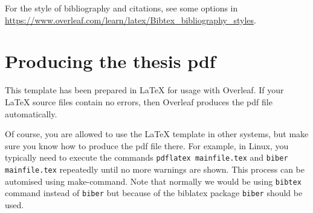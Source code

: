 For the style of bibliography and citations, see some options in \url{https://www.overleaf.com/learn/latex/Bibtex_bibliography_styles}.


\section{Producing the thesis pdf}

This template has been prepared in LaTeX for usage with Overleaf. If your LaTeX source files contain no errors, then Overleaf produces the pdf file automatically.

Of course, you are allowed to use the LaTeX template in other systems, but make sure you know how to produce the pdf file there. 
For example, in Linux, you typically need to execute the commands \texttt{pdflatex mainfile.tex} and \texttt{biber mainfile.tex} repeatedly until no more warnings are shown. This process can be automised using make-command. 
Note that normally we would be using \texttt{bibtex} command instead of \texttt{biber} but because of the biblatex package \texttt{biber} should be used.
